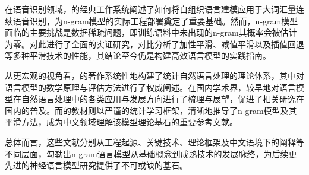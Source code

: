 \documentclass[10pt,letterpaper,conference]{IEEEtran}
\begin{document}
在语音识别领域，\cite{anonndjelinek1990}的经典工作系统阐述了如何将自组织语言建模应用于大词汇量连续语音识别，为n-gram模型的实际工程部署奠定了重要基础。然而，n-gram模型面临的主要挑战是数据稀疏问题，即训练语料中未出现的n-gram其概率会被估计为零。\cite{anonndchen1999}对此进行了全面的实证研究，对比分析了加性平滑、减值平滑以及插值回退等多种平滑技术的性能，其结论至今仍是构建高效语言模型的实践指南。

从更宏观的视角看，\cite{anonndmanning1999}的著作系统性地构建了统计自然语言处理的理论体系，其中对语言模型的数学原理与评估方法进行了权威阐述。在国内学术界，\cite{2020infrared}较早地对语言模型在自然语言处理中的各类应用与发展方向进行了梳理与展望，促进了相关研究在国内的普及。而\cite{2012mapping}的教材则以严谨的统计学习框架，清晰地推导了n-gram模型及其平滑方法，成为中文领域理解该模型理论基石的重要参考文献。

总体而言，这些文献分别从工程起源、关键技术、理论框架及中文语境下的阐释等不同层面，勾勒出n-gram语言模型从基础概念到成熟技术的发展脉络，为后续更先进的神经语言模型研究提供了不可或缺的基石。






\end{document}
